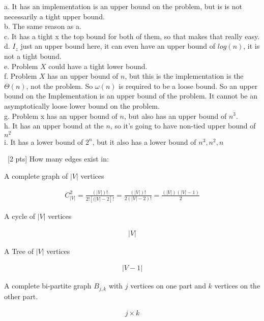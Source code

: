\documentclass[12pt]{article}
\newenvironment{sol}[1][Solution]{\begin{trivlist}\item[\hskip\labelsep {\bfseries #1:}]}{\end{trivlist}}
\begin{document}
\begin{enumerate}
\begin{multicols}{2}
    
    \end{multicols}
    \begin{sol}
    a. It has an implementation is an upper bound on the problem, but is is not necessarily a tight upper bound.\\
    b. The same reason as a.  \\
    c. It has a tight x the top bound for both of them, so that makes that really easy.\\
    d. $I_z$ just an upper bound here, it can even have an upper bound of $log(n)$, it is not a tight bound. \\
    e. Problem $X$ could have a tight lower bound. \\
    f. Problem $X$ has an upper bound of $n$, but this is the implementation is the $\Theta(n)$, not the problem. So $\omega(n)$ is required to be a loose bound. So an upper bound on the Implementation is an upper bound of the problem. It cannot be an asymptotically loose lower bound on the problem. \\
    g. Problem x has an upper bound of $n$, but also has an upper bound of $n^3$.\\
    h. It has an upper bound at the $n$, so it's going to have non-tied upper bound of $n^2$\\
    i. It has a lower bound of $2^n$, but it also has a lower bound of $n^3, n^2, n$ 
    \end{sol}

    \item \ [2 pts] How many edges exist in:
    \begin{enumerate}[i]
        \item A complete graph of $|V|$ vertices 
        \begin{sol}
        \begin{align*}
            C_{|V|}^2= \frac{(|V|)!}{2![(|V|-2]!} = \frac{(|V|)!}{2(|V|-2)!} = \frac{(|V|)(|V|-1)}{2}
        \end{align*}
        \end{sol}
        \item A cycle of $|V|$ vertices 
        \begin{sol}
        \begin{align*}
            |V|
        \end{align*}
        \end{sol}
        \item A Tree of $|V|$ vertices 
        \begin{sol}
        \begin{align*}
            |V-1|
        \end{align*}
        \end{sol}
        \item A complete bi-partite graph $B_{j,k}$ with $j$ vertices on one part and $k$ vertices on the other part. 
        \begin{sol}
        \begin{align*}
            j \times k
        \end{align*}
        \end{sol}
    \end{enumerate}


\end{enumerate}
\end{document}
